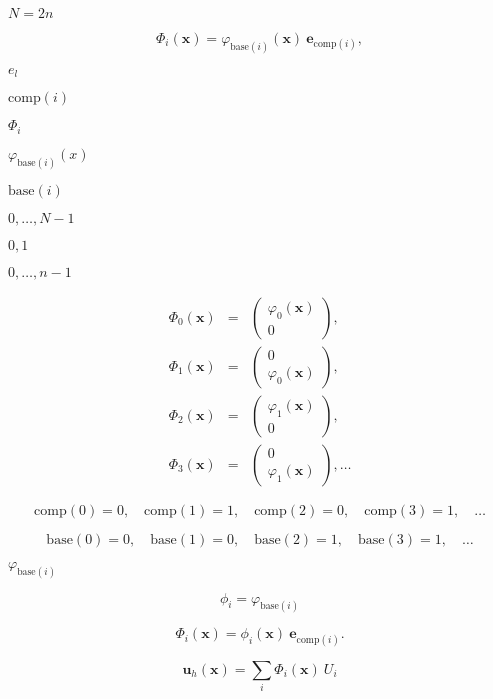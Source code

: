 \documentclass{article}
\begin{document}
$N=2n$
\pagebreak

\[ \Phi_i({\mathbf x}) = \varphi_{\text{base}(i)}({\mathbf x})\ {\mathbf e}_{\text{comp}(i)}, \]
\pagebreak

$e_l$
\pagebreak

$\text{comp}(i)$
\pagebreak

$\Phi_i$
\pagebreak

$\varphi_{\text{base}(i)}(x)$
\pagebreak

$\text{base}(i)$
\pagebreak

$0,\ldots,N-1$
\pagebreak

$0,1$
\pagebreak

$0,\ldots,n-1$
\pagebreak

\begin{eqnarray*} \Phi_0({\mathbf x}) &=& \left(\begin{array}{c} \varphi_0({\mathbf x}) \\ 0 \end{array}\right), \\ \Phi_1({\mathbf x}) &=& \left(\begin{array}{c} 0 \\ \varphi_0({\mathbf x}) \end{array}\right), \\ \Phi_2({\mathbf x}) &=& \left(\begin{array}{c} \varphi_1({\mathbf x}) \\ 0 \end{array}\right), \\ \Phi_3({\mathbf x}) &=& \left(\begin{array}{c} 0 \\ \varphi_1({\mathbf x}) \end{array}\right), \ldots \end{eqnarray*}
\pagebreak

\[ \text{comp}(0)=0, \quad \text{comp}(1)=1, \quad \text{comp}(2)=0, \quad \text{comp}(3)=1, \quad \ldots \]
\pagebreak

\[ \text{base}(0)=0, \quad \text{base}(1)=0, \quad \text{base}(2)=1, \quad \text{base}(3)=1, \quad \ldots \]
\pagebreak

$\varphi_{\text{base}(i)}$
\pagebreak

\[ \phi_i = \varphi_{\text{base}(i)} \]
\pagebreak

\[ \Phi_i({\mathbf x}) = \phi_{i}({\mathbf x})\ {\mathbf e}_{\text{comp}(i)}. \]
\pagebreak

\[ {\mathbf u}_h({\mathbf x}) = \sum_i \Phi_i({\mathbf x})\ U_i \]
\pagebreak
\end{document}
